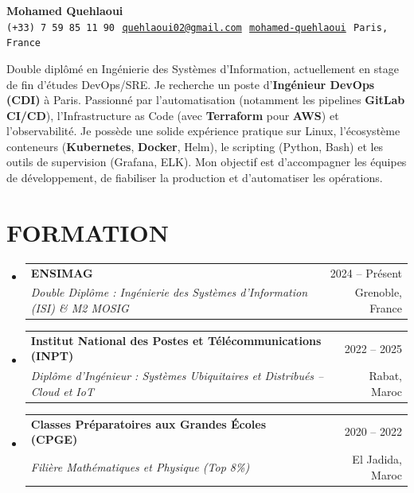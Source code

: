 \documentclass[letterpaper,10pt]{article}
\makeatletter
\newcommand{\resumeSubheading}[4]{
  \vspace{-1pt}\item
    \begin{tabular*}{\textwidth}[t]{l@{\extracolsep{\fill}}r}
      \textbf{#1} & {\color{dark-grey}\small #2}\vspace{1pt}\\
       \textit{#3} & {\color{dark-grey} \small #4}\\
     \end{tabular*}\vspace{-6pt}
}
\newcommand{\resumeSubHeadingListStart}{\begin{itemize}[leftmargin=0in, label={}]}
\newcommand{\resumeSubHeadingListEnd}{\end{itemize}}
\makeatother
\begin{document}
\begin{center}
    \textbf{\Huge Mohamed Quehlaoui} \\ \vspace{5pt}
    \small \faPhone* \texttt{(+33) 7 59 85 11 90} \hspace{1pt} $
$    \hspace{1pt} \faEnvelope \hspace{2pt} \href{mailto:quehlaoui02@gmail.com}{\texttt{quehlaoui02@gmail.com}} \hspace{1pt} $
$     \hspace{1pt} \faLinkedin \hspace{2pt} \href{https://www.linkedin.com/in/mohamed-quehlaoui/}{\texttt{mohamed-quehlaoui}} \hspace{1pt} $
$    \hspace{1pt} \faMapMarker* \hspace{2pt}\texttt{Paris, France}     \\ \vspace{5pt}
\end{center}

\small{Double diplômé en Ingénierie des Systèmes d'Information, actuellement en stage de fin d'études DevOps/SRE. Je recherche un poste d'\textbf{Ingénieur DevOps (CDI)} à Paris. Passionné par l'automatisation (notamment les pipelines \textbf{GitLab CI/CD}), l'Infrastructure as Code (avec \textbf{Terraform} pour \textbf{AWS}) et l'observabilité. Je possède une solide expérience pratique sur Linux, l'écosystème conteneurs (\textbf{Kubernetes}, \textbf{Docker}, Helm), le scripting (Python, Bash) et les outils de supervision (Grafana, ELK). Mon objectif est d'accompagner les équipes de développement, de fiabiliser la production et d'automatiser les opérations.} \vspace{-8pt}

\section {FORMATION}
  \resumeSubHeadingListStart
    \resumeSubheading
      {ENSIMAG}{2024 -- Présent}
      {Double Diplôme : Ingénierie des Systèmes d'Information (ISI) \& M2 MOSIG}{Grenoble, France}
    \resumeSubheading
      {Institut National des Postes et Télécommunications (INPT)}{2022 -- 2025}
      {Diplôme d'Ingénieur : Systèmes Ubiquitaires et Distribués -- Cloud et IoT}{Rabat, Maroc}
    \resumeSubheading
      {Classes Préparatoires aux Grandes Écoles (CPGE)}{2020 -- 2022}
      {Filière Mathématiques et Physique (Top 8\%)}{El Jadida, Maroc}
  \resumeSubHeadingListEnd
\end{document}
